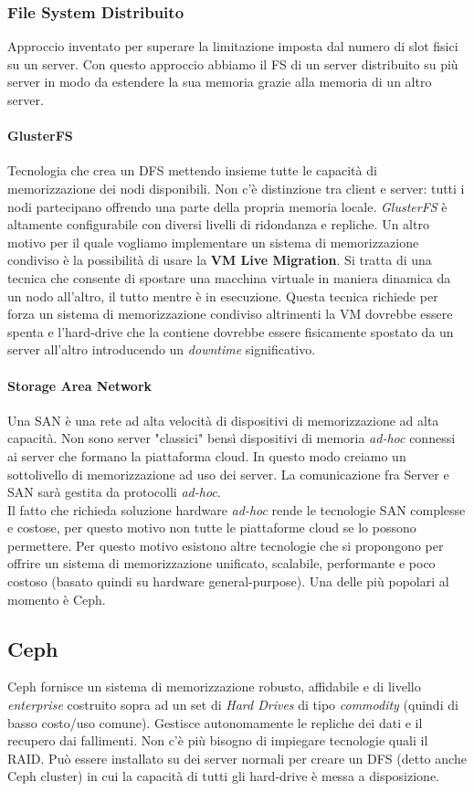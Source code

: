 \documentclass{article}
\begin{document}
\subsubsection{File System Distribuito}
Approccio inventato per superare la limitazione imposta dal numero di slot fisici su un server. Con questo approccio abbiamo il FS di un server distribuito su più server in modo da estendere la sua memoria grazie alla memoria di un altro server.
\paragraph{GlusterFS} Tecnologia che crea un DFS mettendo insieme tutte le capacità di memorizzazione dei nodi disponibili. Non c'è distinzione tra client e server: tutti i nodi partecipano offrendo una parte della propria memoria locale. \textit{GlusterFS} è altamente configurabile con diversi livelli di ridondanza e repliche.
Un altro motivo per il quale vogliamo implementare un sistema di memorizzazione condiviso è la possibilità di usare la \textbf{VM Live Migration}. Si tratta di una tecnica che consente di spostare una macchina virtuale in maniera dinamica da un nodo all'altro, il tutto mentre è in esecuzione. Questa tecnica richiede per forza un sistema di memorizzazione condiviso altrimenti la VM dovrebbe essere spenta e l'hard-drive che la contiene dovrebbe essere fisicamente spostato da un server all'altro introducendo un \textit{downtime} significativo.

\paragraph{Storage Area Network} Una SAN è una rete ad alta velocità di dispositivi di memorizzazione ad alta capacità. Non sono server "classici" bensì dispositivi di memoria \textit{ad-hoc} connessi ai server che formano la piattaforma cloud. In questo modo creiamo un sottolivello di memorizzazione ad uso dei server. La comunicazione fra Server e SAN sarà gestita da protocolli \textit{ad-hoc}.\\
Il fatto che richieda soluzione hardware \textit{ad-hoc} rende le tecnologie SAN complesse e costose, per questo motivo non tutte le piattaforme cloud se lo possono permettere. Per questo motivo esistono altre tecnologie che si propongono per offrire un sistema di memorizzazione unificato, scalabile, performante e poco costoso (basato quindi su hardware general-purpose). Una delle più popolari al momento è Ceph.

\subsection{Ceph}
Ceph fornisce un sistema di memorizzazione robusto, affidabile e di livello \textit{enterprise} costruito sopra ad un set di \textit{Hard Drives} di tipo \textit{commodity} (quindi di basso costo/uso comune). Gestisce autonomamente le repliche dei dati e il recupero dai fallimenti. Non c'è più bisogno di impiegare tecnologie quali il RAID. Può essere installato su dei server normali per creare un DFS (detto anche Ceph cluster) in cui la capacità di tutti gli hard-drive è messa a disposizione.
\end{document}
